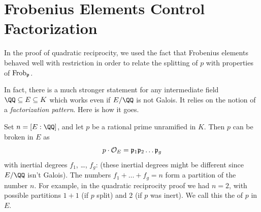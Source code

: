 \section{Frobenius Elements Control Factorization}
In the proof of quadratic reciprocity, we used the fact that Frobenius elements behaved
well with restriction in order to relate the splitting of $p$ with properties of $\mathrm{Frob}_\mathfrak p$.

In fact, there is a much stronger statement for
any intermediate field $\QQ \subseteq E \subseteq K$
which works even if $E/\QQ$ is not Galois.
It relies on the notion of a \emph{factorization pattern}.
Here is how it goes.

Set $n = [E:\QQ]$, and let $p$ be a rational prime unramified in $K$.
Then $p$ can be broken in $E$ as
\[ p \cdot \mathcal O_E = \mathfrak p_1 \mathfrak p_2 \dots \mathfrak p_g \]
with inertial degrees $f_1$, \dots, $f_g$:
(these inertial degrees might be different since $E/\QQ$ isn't Galois).
The numbers $f_1 + \dots + f_g = n$ form a partition of the number $n$.
For example, in the quadratic reciprocity proof we had $n = 2$,
with possible partitions $1 + 1$ (if $p$ split) and $2$ (if $p$ was inert).
We call this the  of $p$ in $E$.

